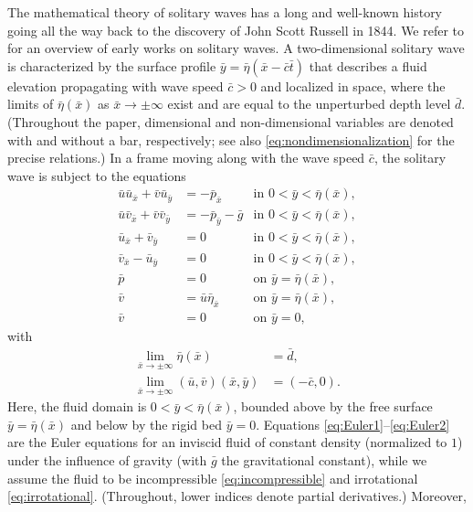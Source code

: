 \documentclass{amsart}
\theoremstyle{definition}
\begin{document}
The mathematical theory of solitary waves has a long and well-known history going all the way back to the discovery of John Scott Russell in 1844. We refer to \cite{Sander1991} for an overview of early works on solitary waves. A two-dimensional solitary wave is characterized by the surface profile $\bar y = \bar \eta(\bar x-\bar c\bar t)$ that describes a fluid elevation propagating with wave speed $\bar c>0$ and localized in space, where the limits of $\bar \eta(\bar x)$ as $\bar x \to \pm \infty$ exist and are equal to the unperturbed depth level $\bar d$. (Throughout the paper, dimensional and non-dimensional variables are denoted with and without a bar, respectively; see also \eqref{eq:nondimensionalization} for the precise relations.) In a frame moving along with the wave speed $\bar c$, the solitary wave is subject to the equations
\begin{subequations}\label{eq:original}
	\begin{align}
		\bar u\bar u_{\bar x} + \bar v\bar u_{\bar y} &= -\bar p_{\bar x} & \text{in }0<\bar y<\bar \eta(\bar x),\label{eq:Euler1}\\
		\bar u\bar v_{\bar x} + \bar v\bar v_{\bar y} &= -\bar p_{\bar y} - \bar g & \text{in }0<\bar y<\bar \eta(\bar x),\label{eq:Euler2}\\
		\bar u_{\bar x} + \bar v_{\bar y} &= 0 & \text{in }0<\bar y<\bar \eta(\bar x),\label{eq:incompressible}\\
		\bar v_{\bar x} - \bar u_{\bar y} &= 0 & \text{in }0<\bar y<\bar \eta(\bar x),\label{eq:irrotational}\\
		\bar p &= 0 & \text{on }\bar y=\bar \eta(\bar x),\label{eq:dynamic}\\
		\bar v &= \bar u\bar \eta_{\bar x} & \text{on }\bar y=\bar \eta(\bar x),\label{eq:kinematic_top_velocity}\\
		\bar v &= 0& \text{on }\bar y=0,\label{eq:kinematic_bottom_velocity}
	\end{align}
\end{subequations}
with
\begin{align}
	\lim_{\bar x\to\pm\infty}\bar \eta(\bar x) &= \bar d,\label{eq:level_at_infty}\\
	\lim_{\bar x\to\pm\infty}(\bar u,\bar v)(\bar x,\bar y) &= (-\bar c,0).\nonumber
\end{align}
Here, the fluid domain is $0<\bar y<\bar \eta(\bar x)$, bounded above by the free surface $\bar y=\bar \eta(\bar x)$ and below by the rigid bed $\bar y=0$. Equations \eqref{eq:Euler1}--\eqref{eq:Euler2} are the Euler equations for an inviscid fluid of constant density (normalized to $1$) under the influence of gravity (with $\bar g$ the gravitational constant), while we assume the fluid to be incompressible \eqref{eq:incompressible} and irrotational \eqref{eq:irrotational}. (Throughout, lower indices denote partial derivatives.) Moreover, 
\end{document}

